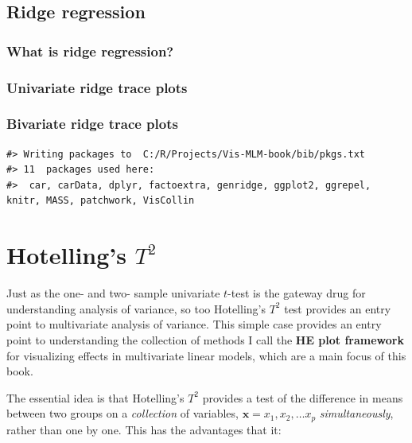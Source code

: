 \documentclass[
  letterpaper,
  10pt,
  krantz2]{krantz}
\begin{document}
\section{Ridge regression}\label{sec:ridge}

\subsection{What is ridge regression?}\label{what-is-ridge-regression}

\subsection{Univariate ridge trace
plots}\label{univariate-ridge-trace-plots}

\subsection{Bivariate ridge trace
plots}\label{bivariate-ridge-trace-plots}

\begin{verbatim}
#> Writing packages to  C:/R/Projects/Vis-MLM-book/bib/pkgs.txt
#> 11  packages used here:
#>  car, carData, dplyr, factoextra, genridge, ggplot2, ggrepel, knitr, MASS, patchwork, VisCollin
\end{verbatim}


\chapter{\texorpdfstring{Hotelling's
\(T^2\)}{Hotelling's T\^{}2}}\label{sec-Hotelling}

Just as the one- and two- sample univariate \(t\)-test is the gateway
drug for understanding analysis of variance, so too Hotelling's \(T^2\)
test provides an entry point to multivariate analysis of variance. This
simple case provides an entry point to understanding the collection of
methods I call the \textbf{HE plot framework} for visualizing effects in
multivariate linear models, which are a main focus of this book.

The essential idea is that Hotelling's \(T^2\) provides a test of the
difference in means between two groups on a \emph{collection} of
variables, \(\mathbf{x} = x_1, x_2, \dots x_p\) \emph{simultaneously},
rather than one by one. This has the advantages that it:
\end{document}

